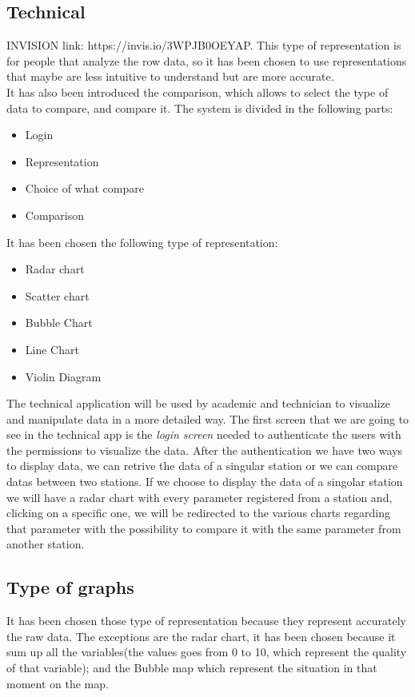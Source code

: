 \documentclass[12pt]{article} %
\begin{document}
\subsection{Technical}
INVISION link: https://invis.io/3WPJB0OEYAP.
This type of representation is for people that analyze the row data, so it has been chosen to use representations that maybe are less intuitive to understand but are more accurate. \\ It has also been introduced the comparison, which allows to select the type of data to compare, and compare it.
The system is divided in the following parts: 
\begin{itemize}
\item Login
\item Representation
\item Choice of what compare  
\item Comparison
\end{itemize}
It has been chosen the following type of representation: 
\begin{itemize}
\item Radar chart
\item Scatter chart
\item Bubble Chart
\item Line Chart
\item Violin Diagram
\end{itemize}
The technical application will be used by academic and technician to visualize and manipulate data in a more detailed way. The first screen that we are going to see in the technical app is the \textit{login screen} needed to authenticate the users with the permissions to visualize the data. After the authentication we have two ways to display data, we can retrive the data of a singular station or we can compare datas between two stations. If we choose to display the data of a singolar station we will have a radar chart with every parameter registered from a station and, clicking on a specific one, we will be redirected to the various charts regarding that parameter with the possibility to compare it with the same parameter from another station.      

\subsection{Type of graphs}
It has been chosen those type of representation because they represent accurately the raw data. The exceptions are the radar chart, it has been chosen because it sum up all the variables(the values goes from 0 to 10, which represent the quality of that variable); and the Bubble map which represent the situation in that moment on the map. 
\end{document}
